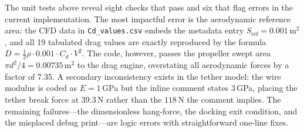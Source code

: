 The unit tests above reveal eight checks that pass and six that flag errors in the current implementation. The most impactful error is the aerodynamic reference area: the CFD data in \texttt{Cd\_values.csv} embeds the metadata entry $S_\text{ref} = 0.001$\,m$^2$, and all 19 tabulated drag values are exactly reproduced by the formula $D = \tfrac{1}{2}\rho \cdot 0.001 \cdot C_d \cdot V^2$. The code, however, passes the propeller swept area $\pi d^2/4 = 0.00735$\,m$^2$ to the drag engine, overstating all aerodynamic forces by a factor of 7.35. A secondary inconsistency exists in the tether model: the wire modulus is coded as $E = 1$\,GPa but the inline comment states $3$\,GPa, placing the tether break force at $39.3$\,N rather than the $118$\,N the comment implies. The remaining failures—the dimensionless hang-force, the docking exit condition, and the misplaced debug print—are logic errors with straightforward one-line fixes.
